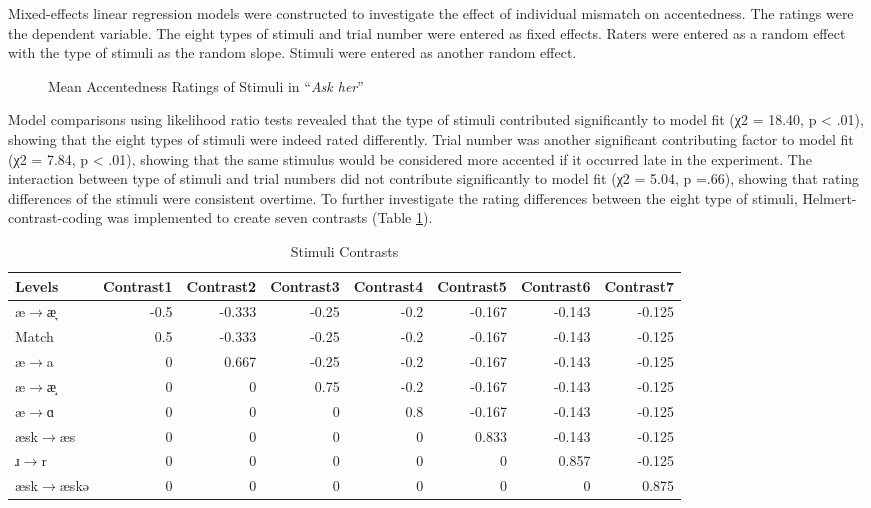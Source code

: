 Mixed-effects linear regression models were constructed to investigate the effect of individual mismatch on accentedness. The ratings were the dependent variable. The eight types of stimuli and trial number were entered as fixed effects. Raters were entered as a random effect with the type of stimuli as the random slope. Stimuli were entered as another random effect.


\begin{figure}[h!]
  \figSpace
\centering

\caption{Mean Accentedness Ratings of Stimuli in “\textit{Ask her}”}
\label{fig:ah1}
\figSpace
\end{figure}

Model comparisons using likelihood ratio tests revealed that the type of stimuli contributed significantly to model fit (χ2 = 18.40, p < .01), showing that the eight types of stimuli were indeed rated differently.  Trial number was another significant contributing factor to model fit (χ2 = 7.84, p < .01), showing that the same stimulus would be considered more accented if it occurred late in the experiment. The interaction between type of stimuli and trial numbers did not contribute significantly to model fit (χ2 = 5.04, p =.66), showing that rating differences of the stimuli were consistent overtime. To further investigate the rating differences between the eight type of stimuli, Helmert-contrast-coding was implemented to create seven contrasts (Table \ref{table:contr1}).

\begin{table}[h!]
  \centering
    \figSpace
  \caption{Stimuli Contrasts}
  \label{table:contr1}%
    \begin{tabular}{lrrrrrrr}
    \toprule
 Levels & Contrast1 & Contrast2 & Contrast3 & Contrast4 & Contrast5 & Contrast6 & Contrast7 \\
    \midrule
    æ$\rightarrow$æ̞    & -0.5  & -0.333 & -0.25 & -0.2  & -0.167 & -0.143 & -0.125 \\
    Match     & 0.5   & -0.333 & -0.25 & -0.2  & -0.167 & -0.143 & -0.125 \\
    æ$\rightarrow$a     & 0     & 0.667 & -0.25 & -0.2  & -0.167 & -0.143 & -0.125 \\
    æ$\rightarrow$æ̝     & 0     & 0     & 0.75  & -0.2  & -0.167 & -0.143 & -0.125 \\
    æ$\rightarrow$ɑ     & 0     & 0     & 0     & 0.8   & -0.167 & -0.143 & -0.125 \\
    æsk$\rightarrow$æs     & 0     & 0     & 0     & 0     & 0.833 & -0.143 & -0.125 \\
    ɹ$\rightarrow$r     & 0     & 0     & 0     & 0     & 0     & 0.857 & -0.125 \\
    æsk$\rightarrow$æskə    & 0     & 0     & 0     & 0     & 0     & 0     & 0.875 \\
    \bottomrule
    \end{tabular}%
      \figSpace
\end{table}%

